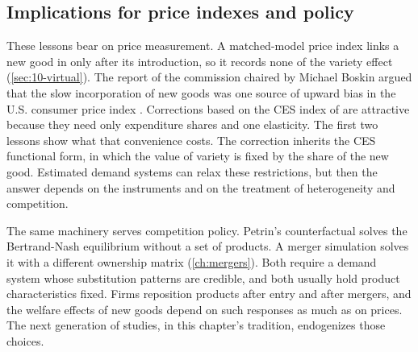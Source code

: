 \subsection{Implications for price indexes and policy}\label{sec:10-synthesis-policy}

These lessons bear on price measurement. A matched-model price index links a new good in only after its introduction,
so it records none of the variety effect (\cref{sec:10-virtual}). The report of the commission chaired by Michael Boskin
argued that the slow incorporation of new goods was one source of upward bias in the U.S. consumer price index
\citep{BoskinEtAl1996}. Corrections based on the CES index of \citet{Feenstra1994} are attractive because they need only
expenditure shares and one elasticity. The first two lessons show what that convenience costs. The correction inherits
the CES functional form, in which the value of variety is fixed by the share of the new good. Estimated demand systems
can relax these restrictions, but then the answer depends on the instruments and on the treatment of heterogeneity and
competition.

The same machinery serves competition policy. Petrin's counterfactual solves the Bertrand-Nash equilibrium without a set
of products. A merger simulation solves it with a different ownership matrix (\cref{ch:mergers}). Both require a demand
system whose substitution patterns are credible, and both usually hold product characteristics fixed. Firms
reposition products after entry and after mergers, and the welfare effects of new goods depend on such responses as
much as on prices. The next generation of studies, in this chapter's tradition, endogenizes those choices.
